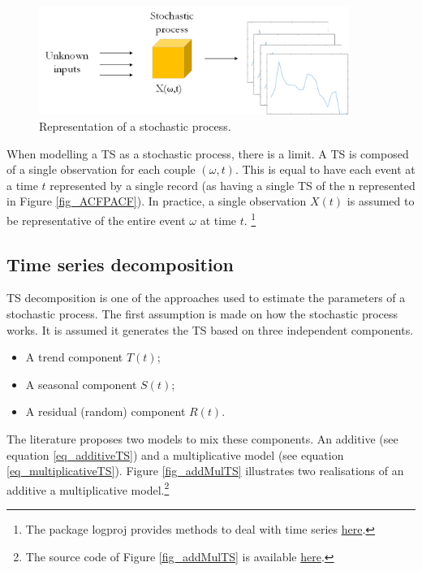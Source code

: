 \begin{figure}[hbt!]
\centering
\includegraphics[width=0.9\textwidth]{SectionLetsMath/elemStat_figures/fig_stochProcess.png}
\captionsetup{type=figure}
\caption{Representation of a stochastic process.}
\label{fig_stochProcess}
\end{figure}


When modelling a TS as a stochastic process, there is a limit. A TS is composed of a single observation for each couple $(\omega,t)$. This is equal to have each event at a time $t$ represented by a single record (as having a single TS of the n represented in Figure \ref{fig_ACFPACF}). In practice, a single observation $X(t)$ is assumed to be representative of the entire event $\omega$ at time $t$. \footnote{The package logproj provides methods to deal with time series \href{https://github.com/aletuf93/logproj/blob/master/logproj/stat_time_series.py}{here}.
}

\subsection{Time series decomposition} \label{secTimeSeriesDecomposition}
TS decomposition is one of the approaches used to estimate the parameters of a stochastic process. The first assumption is made on how the stochastic process works. It is assumed it generates the TS based on three independent components.
\begin{itemize}
    \item A trend component $T(t)$;
    \item A seasonal component $S(t)$;
    \item A residual (random) component $R(t)$.
\end{itemize}

The literature proposes two models to mix these components. An additive (see equation \ref{eq_additiveTS}) and a multiplicative model (see equation \ref{eq_multiplicativeTS}). Figure \ref{fig_addMulTS} illustrates two realisations of an additive a multiplicative model.\footnote{The source code of Figure \ref{fig_addMulTS} is available \href{https://github.com/aletuf93/logproj/blob/master/examples/03.\%20Statistics.ipynb}{here}.}

